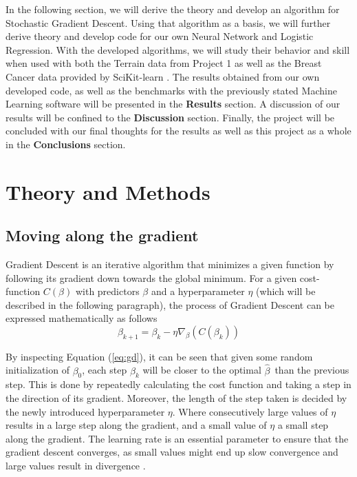 \documentclass
[twocolumn,
secnumarabic,
nobibnotes,
aps,
prl,
reprint,
groupedaddress,
amsmath,
amssymb
]{revtex4-2}
\begin{document}
In the following section, we will derive the theory and develop an algorithm for Stochastic Gradient Descent. Using that algorithm as a basis, we will further derive theory and develop code for our own Neural Network and Logistic Regression. With the developed algorithms, we will study their behavior and skill when used with both the Terrain data from Project 1 as well as the Breast Cancer data provided by SciKit-learn \cite{scikit-learn}. The results obtained from our own developed code, as well as the benchmarks with the previously stated Machine Learning software will be presented in the \textbf{Results} section. A discussion of our results will be confined to the \textbf{Discussion} section. Finally, the project will be concluded with our final thoughts for the results as well as this project as a whole in the \textbf{Conclusions} section.

\section{Theory and Methods}
\subsection{Moving along the gradient}
Gradient Descent is an iterative algorithm that minimizes a given function by following its gradient down towards the global minimum. For a given cost-function $C(\beta)$ with predictors $\beta$ and a hyperparameter $\eta$ (which will be described in the following paragraph), the process of Gradient Descent can be expressed mathematically as follows
\begin{equation}
  \label{eq:gd}
  \beta_{k+1} = \beta_k - \eta\nabla_\beta\left(C(\beta_k)\right)
\end{equation}

By inspecting Equation (\ref{eq:gd}), it can be seen that given some random initialization of $\beta_0$, each step $\beta_k$ will be closer to the optimal $\hat{\beta}$ than the previous step. This is done by repeatedly calculating the cost function and taking a step in the direction of its gradient. Moreover, the length of the step taken is decided by the newly introduced hyperparameter $\eta$. Where consecutively large values of $\eta$ results in a large step along the gradient, and a small value of $\eta$ a small step along the gradient. The learning rate is an essential parameter to ensure that the gradient descent converges, as small values might end up slow convergence and large values result in divergence \cite{Geron2019}.
\end{document}
